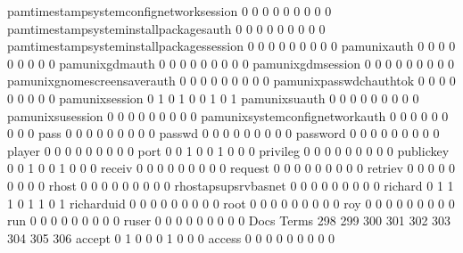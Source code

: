 \documentclass[compress,8pt]{beamer}
\begin{document}
\begin{frame}
\begin{Schunk}
  pamtimestampsystemconfignetworksession     0   0   0   0   0   0   0   0   0
  pamtimestampsysteminstallpackagesauth      0   0   0   0   0   0   0   0   0
  pamtimestampsysteminstallpackagessession   0   0   0   0   0   0   0   0   0
  pamunixauth                                0   0   0   0   0   0   0   0   0
  pamunixgdmauth                             0   0   0   0   0   0   0   0   0
  pamunixgdmsession                          0   0   0   0   0   0   0   0   0
  pamunixgnomescreensaverauth                0   0   0   0   0   0   0   0   0
  pamunixpasswdchauthtok                     0   0   0   0   0   0   0   0   0
  pamunixsession                             0   1   0   1   0   0   1   0   1
  pamunixsuauth                              0   0   0   0   0   0   0   0   0
  pamunixsusession                           0   0   0   0   0   0   0   0   0
  pamunixsystemconfignetworkauth             0   0   0   0   0   0   0   0   0
  pass                                       0   0   0   0   0   0   0   0   0
  passwd                                     0   0   0   0   0   0   0   0   0
  password                                   0   0   0   0   0   0   0   0   0
  player                                     0   0   0   0   0   0   0   0   0
  port                                       0   0   1   0   0   1   0   0   0
  privileg                                   0   0   0   0   0   0   0   0   0
  publickey                                  0   0   1   0   0   1   0   0   0
  receiv                                     0   0   0   0   0   0   0   0   0
  request                                    0   0   0   0   0   0   0   0   0
  retriev                                    0   0   0   0   0   0   0   0   0
  rhost                                      0   0   0   0   0   0   0   0   0
  rhostapsupsrvbasnet                        0   0   0   0   0   0   0   0   0
  richard                                    0   1   1   1   0   1   1   0   1
  richarduid                                 0   0   0   0   0   0   0   0   0
  root                                       0   0   0   0   0   0   0   0   0
  roy                                        0   0   0   0   0   0   0   0   0
  run                                        0   0   0   0   0   0   0   0   0
  ruser                                      0   0   0   0   0   0   0   0   0
                                          Docs
Terms                                      298 299 300 301 302 303 304 305 306
  accept                                     0   1   0   0   0   1   0   0   0
  access                                     0   0   0   0   0   0   0   0   0

\end{Schunk}
\end{frame}
\end{document}
